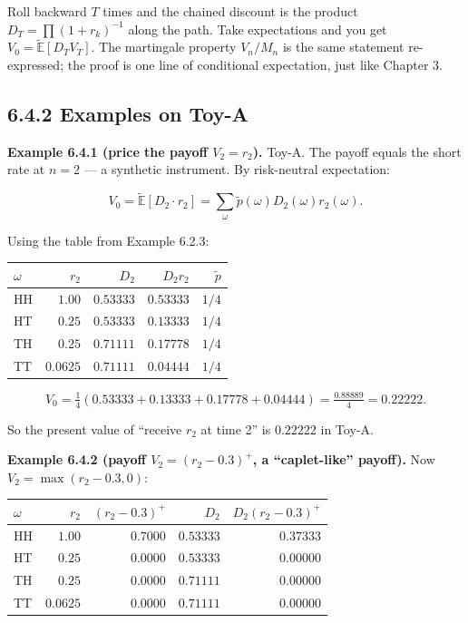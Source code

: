 \documentclass[
  10pt,
  twoside]{book}
\newcounter{none} %
\begin{document}
Roll backward \(T\) times and the chained discount is the product
\(D_T = \prod (1 + r_k)^{-1}\) along the path. Take expectations and you
get \(V_0 = \tilde{\mathbb E}[D_T V_T]\). The martingale property
\(V_n / M_n\) is the same statement re-expressed; the proof is one line
of conditional expectation, just like Chapter 3.

\subsection{6.4.2 Examples on Toy-A}\label{examples-on-toy-a-2}

\textbf{Example 6.4.1 (price the payoff \(V_2 = r_2\)).} Toy-A. The
payoff equals the short rate at \(n = 2\) --- a synthetic instrument. By
risk-neutral expectation:

\[V_0 = \tilde{\mathbb E}[D_2 \cdot r_2] = \sum_\omega \tilde p(\omega) D_2(\omega) r_2(\omega).\]

Using the table from Example 6.2.3:

{\def\LTcaptype{none} %
\begin{table}[H]
\centering
\begin{tabular}{|l|r|r|r|r|}
\toprule
\(\omega\) & \(r_2\) & \(D_2\) & \(D_2 r_2\) & \(\tilde p\) \\
\midrule



HH & \(1.00\) & \(0.53333\) & \(0.53333\) & \(1/4\) \\
HT & \(0.25\) & \(0.53333\) & \(0.13333\) & \(1/4\) \\
TH & \(0.25\) & \(0.71111\) & \(0.17778\) & \(1/4\) \\
TT & \(0.0625\) & \(0.71111\) & \(0.04444\) & \(1/4\) \\
\bottomrule
\end{tabular}
\end{table}
}

\[V_0 = \tfrac{1}{4}(0.53333 + 0.13333 + 0.17778 + 0.04444) = \tfrac{0.88889}{4} = 0.22222.\]

So the present value of ``receive \(r_2\) at time 2'' is \(0.22222\) in
Toy-A.

\textbf{Example 6.4.2 (payoff \(V_2 = (r_2 - 0.3)^+\), a ``caplet-like''
payoff).} Now \(V_2 = \max(r_2 - 0.3, 0)\):

{\def\LTcaptype{none} %
\begin{table}[H]
\centering
\begin{tabular}{|l|r|r|r|r|}
\toprule
\(\omega\) & \(r_2\) & \((r_2 - 0.3)^+\) & \(D_2\) &
\(D_2(r_2 - 0.3)^+\) \\
\midrule



HH & \(1.00\) & \(0.7000\) & \(0.53333\) & \(0.37333\) \\
HT & \(0.25\) & \(0.0000\) & \(0.53333\) & \(0.00000\) \\
TH & \(0.25\) & \(0.0000\) & \(0.71111\) & \(0.00000\) \\
TT & \(0.0625\) & \(0.0000\) & \(0.71111\) & \(0.00000\) \\
\bottomrule
\end{tabular}
\end{table}
}
\end{document}
